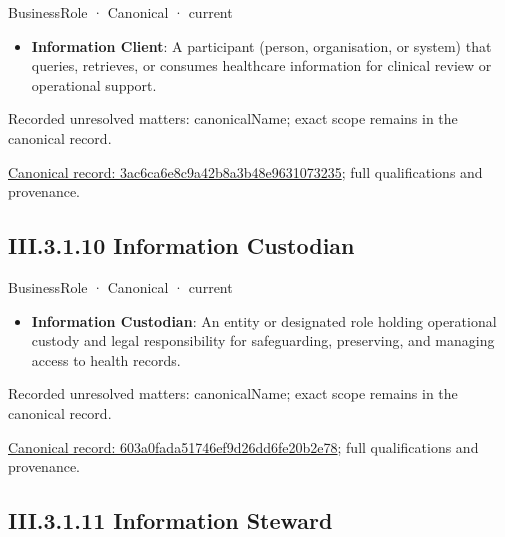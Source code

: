 \label{element:3ac6ca6e8c9a42b8a3b48e9631073235}
{\small BusinessRole · Canonical · current}\par

\begin{itemize}


\item \textbf{Information Client}: A participant (person, organisation, or system) that queries, retrieves, or consumes healthcare information for clinical review or operational support.

\end{itemize}

{\small Recorded unresolved matters: canonicalName; exact scope remains in the canonical record.}\par
{\footnotesize \href{../../../../../../../continuum/business/business-role/3ac6ca6e8c9a42b8a3b48e9631073235.md}{Canonical record: 3ac6ca6e8c9a42b8a3b48e9631073235}; full qualifications and provenance.}\par
\subsection*{III.3.1.10 Information Custodian}
\label{navigation:III.3.1.10}

\label{element:603a0fada51746ef9d26dd6fe20b2e78}
{\small BusinessRole · Canonical · current}\par

\begin{itemize}


\item \textbf{Information Custodian}: An entity or designated role holding operational custody and legal responsibility for safeguarding, preserving, and managing access to health records.

\end{itemize}

{\small Recorded unresolved matters: canonicalName; exact scope remains in the canonical record.}\par
{\footnotesize \href{../../../../../../../continuum/business/business-role/603a0fada51746ef9d26dd6fe20b2e78.md}{Canonical record: 603a0fada51746ef9d26dd6fe20b2e78}; full qualifications and provenance.}\par
\subsection*{III.3.1.11 Information Steward}
\label{navigation:III.3.1.11}

